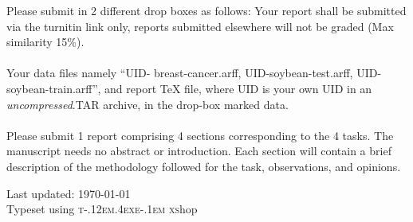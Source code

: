 \documentclass[12pt]{article} %
\begin{document}
Please submit in 2 different drop boxes as follows: Your report shall be submitted via the turnitin link only, reports submitted elsewhere will not be graded (Max similarity 15\%).\\ \\
Your data files namely “UID- breast-cancer.arff, UID-soybean-test.arff, UID-soybean-train.arff”, and report TeX file, where UID is your own UID in an \emph{\color{blue}uncompressed\color{black}}.TAR archive, in the drop-box marked data.\\\\Please submit 1 report comprising 4 sections corresponding to the 4 tasks. The manuscript needs no abstract or introduction.  Each section will contain a brief description of the methodology followed for the task, observations, and opinions.
\vfill
\hrulefill
\begin{center}
{\scriptsize  Last updated: \today\-  
\\Typeset using \color{blue} \textsc{t\kern -.12em\lower.4ex\hbox{e}\kern-.1em xs}hop}
\end{center}
\end{document}
